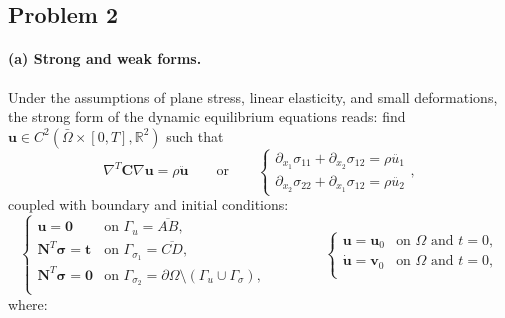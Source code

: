 \documentclass[12pt]{article}
\begin{document}
\newpage
\subsection*{Problem 2}
\paragraph*{(a) Strong and weak forms.} Under the assumptions of plane stress, linear elasticity, and small deformations, the strong form of the dynamic equilibrium equations reads: find $\mathbf u\in C^2(\bar \Omega\times[0,T],\mathbb R^2)$ such that
$$ \nabla^T\mathbf C\nabla\mathbf u = \rho \ddot{\mathbf u}
	\qquad \text{or}\qquad \begin{cases}
		\partial_{x_1}\sigma_{11} + \partial_{x_2}\sigma_{12}  = \rho \ddot{u_{1}} \\
		\partial_{x_2}\sigma_{22} + \partial_{x_1}\sigma_{12}  = \rho \ddot{u_{2}}
	\end{cases},$$
coupled with boundary and initial conditions:
\[
	\begin{cases}
		\mathbf{u} = \mathbf{0}                     & \text{on } \Gamma_u = \overline{AB},                                              \\
		\mathbf N^T\boldsymbol{\sigma} = \mathbf{t} & \text{on } \Gamma_{\sigma_1} = \overline{CD},                                     \\
		\mathbf N^T\boldsymbol{\sigma} = \mathbf{0} & \text{on } \Gamma_{\sigma_2}=\partial\Omega\setminus(\Gamma_u\cup \Gamma_\sigma), \\
	\end{cases}
	\qquad\qquad
	\begin{cases}
		\mathbf u = \mathbf u_0       & \text{on } \Omega \text{ and } t=0, \\
		\dot{\mathbf u} = \mathbf v_0 & \text{on } \Omega \text{ and } t=0, \\
	\end{cases}
\]
where:
\end{document}
